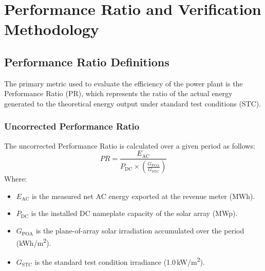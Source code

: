 \section{Performance Ratio and Verification Methodology}
\label{sec:performance_metrics}

\subsection{Performance Ratio Definitions}
The primary metric used to evaluate the efficiency of the power plant is the Performance Ratio (PR), which represents the ratio of the actual energy generated to the theoretical energy output under standard test conditions (STC).

\subsubsection{Uncorrected Performance Ratio}
The uncorrected Performance Ratio is calculated over a given period as follows:
\begin{equation}
    PR = \frac{E_{\text{AC}}}{P_{\text{DC}} \times \left( \frac{G_{\text{POA}}}{G_{\text{STC}}} \right)}
\end{equation}
Where:
\begin{itemize}
    \item $E_{\text{AC}}$ is the measured net AC energy exported at the revenue meter (MWh).
    \item $P_{\text{DC}}$ is the installed DC nameplate capacity of the solar array (MWp).
    \item $G_{\text{POA}}$ is the plane-of-array solar irradiation accumulated over the period (kWh/m\textsuperscript{2}).
    \item $G_{\text{STC}}$ is the standard test condition irradiance (1.0\,kW/m\textsuperscript{2}).
\end{itemize}


